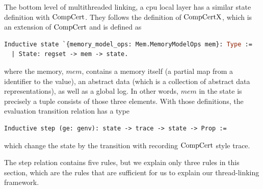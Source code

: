 The bottom level of multithreaded linking, a cpu local layer has a similar state definition with $\mathrm{CompCert}$. 
They follows the definition of $\mathrm{CompCertX}$, 
which is an extension of $\mathrm{CompCert}$ and is defined as
\begin{lstlisting}[language=Caml]
Inductive state `{memory_model_ops: Mem.MemoryModelOps mem}: Type :=
  | State: regset -> mem -> state.
\end{lstlisting}
where the memory, $mem$, contains a memory itself (a partial map from a identifier to the value), an abstract data (which is a collection of abstract data representations), as well as
a global log.
In other words, 
$mem$ in the state is precisely a tuple consists of those three elements.
With those definitions, the evaluation transition relation has a type
\begin{lstlisting}[language=Caml]
  Inductive step (ge: genv): state -> trace -> state -> Prop :=
\end{lstlisting}
which change the state by the transition with recording $\mathrm{CompCert}$ style trace. 

The step relation contains five rules, 
but we explain only three rules in this section, which are the rules 
that are sufficient for us to explain our thread-linking framework.

